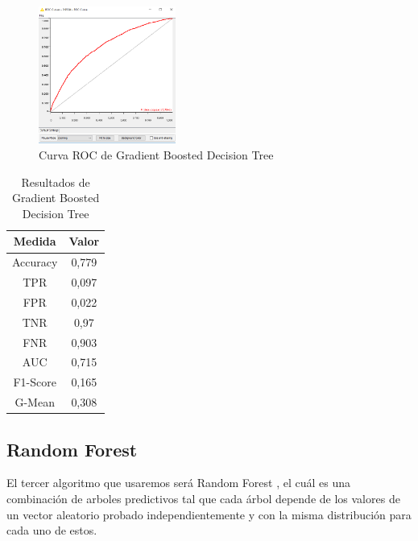 	\begin{figure}[htb]
		\centering
		\includegraphics[width=0.4\textwidth]{./imagenes/12}
		\caption{Curva ROC de Gradient Boosted Decision Tree} \label{fig:1}
	\end{figure}

	\begin{table}[htbp]
		\begin{center}
			\begin{tabular}{|c|c|}
				\hline
				Medida & Valor \\
				\hline \hline
				Accuracy & 0,779 \\
				\hline
				TPR &  0,097 \\
				\hline
				FPR &  0,022 \\
				\hline
				TNR &  0,97 \\
				\hline
				FNR &  0,903 \\
				\hline
				AUC &  0,715 \\
				\hline
				F1-Score & 0,165 \\
				\hline	
				G-Mean & 0,308 \\
				\hline
			\end{tabular}
			\caption{Resultados de Gradient Boosted Decision Tree}
			\label{tabla:sencilla}
		\end{center}
	\end{table}


	\subsection{Random Forest}

	El tercer algoritmo que usaremos será Random Forest \cite{Wikipedia4} , el cuál es una
	combinación de arboles predictivos tal que cada árbol depende de los valores de un vector aleatorio
	 probado independientemente y con la misma distribución para cada uno de estos.

